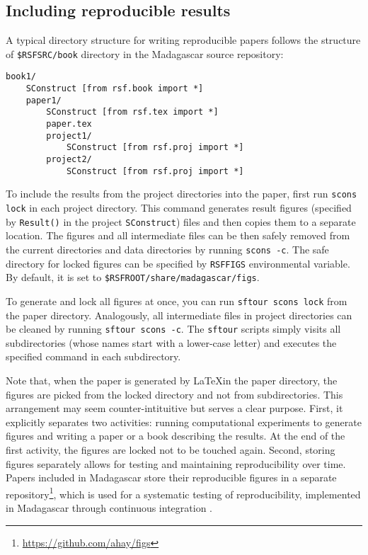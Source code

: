 {{\subsection{Including reproducible results}

A typical directory structure for writing reproducible papers follows the structure of \texttt{\$RSFSRC/book} directory in the Madagascar source repository:
\begin{verbatim}
book1/
    SConstruct [from rsf.book import *]
    paper1/
        SConstruct [from rsf.tex import *]
        paper.tex
        project1/
            SConstruct [from rsf.proj import *]
        project2/
            SConstruct [from rsf.proj import *]
\end{verbatim}

To include the results from the project directories into the paper,
first run \texttt{scons lock} in each project directory. This command
generates result figures (specified by \texttt{Result()} in the
project \texttt{SConstruct}) files and then copies them to a separate
location. The figures and all intermediate files can be then safely
removed from the current directories and data directories by running
\texttt{scons -c}. The safe directory for locked figures can be
specified by \texttt{RSFFIGS} environmental variable. By default, it is
set to \texttt{\$RSFROOT/share/madagascar/figs}.

To generate and lock all figures at once, you can run \texttt{sftour
  scons lock} from the paper directory. Analogously, all intermediate
files in project directories can be cleaned by running \texttt{sftour
  scons -c}. The \texttt{sftour} scripts simply visits all
subdirectories (whose names start with a lower-case letter) and
executes the specified command in each subdirectory.
  
Note that, when the paper is generated by \LaTeX in the paper
directory, the figures are picked from the locked directory and not
from subdirectories. This arrangement may seem counter-intituitive but
serves a clear purpose. First, it explicitly separates two activities:
running computational experiments to generate figures and writing a
paper or a book describing the results. At the end of the first
activity, the figures are locked not to be touched again. Second,
storing figures separately allows for testing and maintaining
reproducibility over time. Papers included in Madagascar store their
reproducible figures in a separate
repository\footnote{\url{https://github.com/ahay/figs}}, which is used
for a systematic testing of reproducibility, implemented in Madagascar
through continuous integration \cite[]{duvall2007continuous}.

}}
